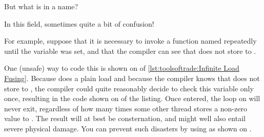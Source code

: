 \begin{description}[labelsep=.4em]
{	But what is in a name?

	In this field, sometimes quite a bit of confusion!
}\QuickQuizEnd

For example, suppose that it is necessary to invoke a function
named  repeatedly until the variable
 was set, and that the compiler can see that
 does not store to .
\begin{fcvref}
One (unsafe) way to code this is shown on  of
\cref{lst:toolsoftrade:Infinite Load Fusing}.
Because  does a plain load and because the compiler knows that
 does not store to , the
compiler could quite reasonably decide to check this variable only once,
resulting in the code shown on  of the listing.
Once entered, the loop on will never exit, regardless of how
many times some other thread stores a non-zero value to .
The result will at best be consternation, and might well also entail
severe physical damage.
You can prevent such disasters by using  as shown
on .
\end{fcvref}


\end{description}
